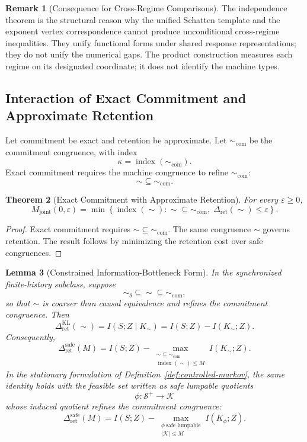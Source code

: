 \documentclass[12pt]{article}
\newtheorem{theorem}{Theorem}[section]
\newtheorem{lemma}[theorem]{Lemma}
\theoremstyle{definition}
\newtheorem{remark}[theorem]{Remark}
\newcommand{\Splus}{\mathcal S^{+}}
\begin{document}
\begin{remark}[Consequence for Cross-Regime Comparisons]
\label{rem:independence-use}
The independence theorem is the structural reason why the unified Schatten
template and the exponent vertex correspondence cannot produce unconditional
cross-regime inequalities.  They unify functional forms under shared response
representations; they do not unify the numerical gaps.  The product
construction measures each regime on its designated coordinate; it does not
identify the machine types.
\end{remark}

\subsection{Interaction of Exact Commitment and Approximate Retention}
\label{subsec:interaction}

Let commitment be exact and retention be approximate.  Let
$\sim_{\mathrm{com}}$ be the commitment congruence, with index
\[
\kappa=\operatorname{index}(\sim_{\mathrm{com}}).
\]
Exact commitment requires the machine congruence to refine
$\sim_{\mathrm{com}}$:
\[
\sim\subseteq\sim_{\mathrm{com}}.
\]

\begin{theorem}[Exact Commitment with Approximate Retention]
\label{thm:interaction}
For every $\varepsilon\ge0$,
\[
M_{\mathrm{joint}}(0,\varepsilon)
=
\min
\left\{
\operatorname{index}(\sim):
\sim\subseteq\sim_{\mathrm{com}},
\;
\Delta_{\mathrm{ret}}(\sim)\le\varepsilon
\right\}.
\]
\end{theorem}

\begin{proof}
Exact commitment requires $\sim\subseteq\sim_{\mathrm{com}}$.  The same
congruence $\sim$ governs retention.  The result follows by minimizing the
retention cost over safe congruences.
\end{proof}

\begin{lemma}[Constrained Information-Bottleneck Form]
\label{lem:constrained-ib}
In the synchronized finite-history subclass, suppose
\[
\sim_\delta\subseteq\sim\subseteq\sim_{\mathrm{com}},
\]
so that $\sim$ is coarser than causal equivalence and refines the commitment
congruence.  Then
\[
\Delta_{\mathrm{ret}}^{\mathrm{KL}}(\sim)
=
I(S;Z\mid K_\sim)
=
I(S;Z)-I(K_\sim;Z).
\]
Consequently,
\[
\Delta_{\mathrm{ret}}^{\mathrm{safe}}(M)
=
I(S;Z)
-
\max_{\substack{
\sim\subseteq\sim_{\mathrm{com}}\\
\operatorname{index}(\sim)\le M
}}
I(K_\sim;Z).
\]
In the stationary formulation of
Definition~\ref{def:controlled-markov}, the same identity holds with the
feasible set written as safe lumpable quotients
\[
\phi:\Splus\to\mathcal K
\]
whose induced quotient refines the commitment congruence:
\[
\Delta_{\mathrm{ret}}^{\mathrm{safe}}(M)
=
I(S;Z)
-
\max_{\substack{
\phi\ \text{safe lumpable}\\
|\mathcal K|\le M
}}
I(K_\phi;Z).
\]
\end{lemma}
\end{document}
